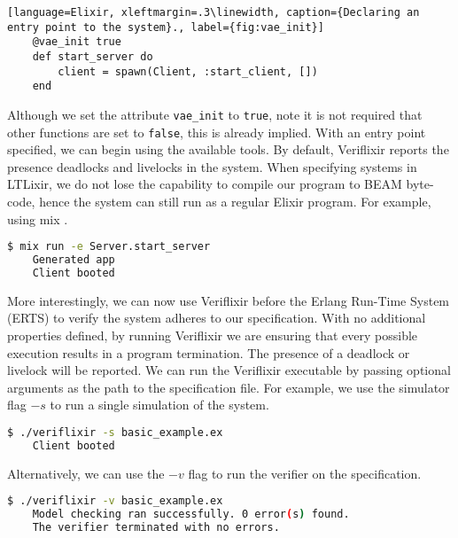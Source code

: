 \begin{lstlisting}[language=Elixir, xleftmargin=.3\linewidth, caption={Declaring an entry point to the system}., label={fig:vae_init}]
    @vae_init true
    def start_server do
        client = spawn(Client, :start_client, [])
    end
\end{lstlisting}
Although we set the attribute \texttt{vae\_init} to \texttt{true}, note it is not required that other functions are set to \texttt{false}, this is already implied. With an entry point specified, we can begin using the available tools. By default, Veriflixir reports the presence deadlocks and livelocks in the system. When specifying systems in LTLixir, we do not lose the capability to compile our program to BEAM byte-code, hence the system can still run as a regular Elixir program. For example, using mix \cite{mix}.
\begin{lstlisting}[language=bash, xleftmargin=.3\linewidth]
    $ mix run -e Server.start_server
    Generated app
    Client booted
\end{lstlisting}
More interestingly, we can now use Veriflixir before the Erlang Run-Time System (ERTS) to verify the system adheres to our specification. With no additional properties defined, by running Veriflixir we are ensuring that every possible execution results in a program termination. The presence of a deadlock or livelock will be reported. We can run the Veriflixir executable by passing optional arguments as the path to the specification file. For example, we use the simulator flag $-s$ to run a single simulation of the system.
\begin{lstlisting}[language=bash, xleftmargin=.3\linewidth]
    $ ./veriflixir -s basic_example.ex 
    Client booted
\end{lstlisting}
Alternatively, we can use the $-v$ flag to run the verifier on the specification.
\begin{lstlisting}[language=bash, xleftmargin=.3\linewidth]
    $ ./veriflixir -v basic_example.ex 
    Model checking ran successfully. 0 error(s) found.
    The verifier terminated with no errors.
\end{lstlisting}
